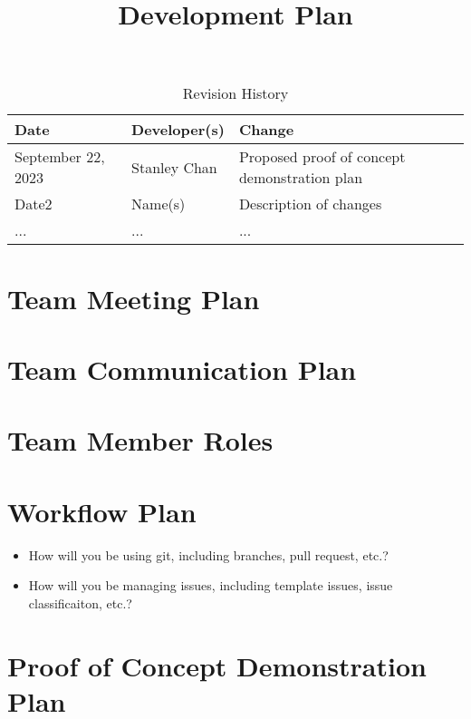 \documentclass{article}
\title{Development Plan\\\progname}
\author{\authname}
\date{}
\begin{document}
\maketitle

\begin{table}[hp]
\caption{Revision History} \label{TblRevisionHistory}
\begin{tabularx}{\textwidth}{llX}
\toprule
\textbf{Date} & \textbf{Developer(s)} & \textbf{Change}\\
\midrule
September 22, 2023 & Stanley Chan & Proposed proof of concept demonstration plan\\
Date2 & Name(s) & Description of changes\\
... & ... & ...\\
\bottomrule
\end{tabularx}
\end{table}


\section{Team Meeting Plan}

\section{Team Communication Plan}

\section{Team Member Roles}

\section{Workflow Plan}

\begin{itemize}
	\item How will you be using git, including branches, pull request, etc.?
	\item How will you be managing issues, including template issues, issue
	classificaiton, etc.?
\end{itemize}

\section{Proof of Concept Demonstration Plan}
\end{document}
